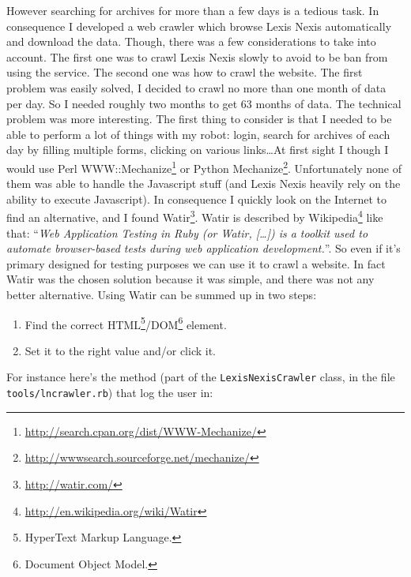 \documentclass[12pt]{report}
\begin{document}
			However searching for archives for more than a few days is a tedious task. In consequence I developed a web crawler which browse Lexis Nexis automatically and download the data. Though, there was a few considerations to take into account. The first one was to crawl Lexis Nexis slowly to avoid to be ban from using the service. The second one was how to crawl the website. The first problem was easily solved, I decided to crawl no more than one month of data per day. So I needed roughly two months to get 63 months of data. The technical problem was more interesting. The first thing to consider is that I needed to be able to perform a lot of things with my robot: login, search for archives of each day by filling multiple forms, clicking on various links\ldots At first sight I though I would use Perl WWW::Mechanize\footnote{\url{http://search.cpan.org/dist/WWW-Mechanize/}} or Python Mechanize\footnote{\url{http://wwwsearch.sourceforge.net/mechanize/}}. Unfortunately none of them was able to handle the Javascript stuff (and Lexis Nexis heavily rely on the ability to execute Javascript). In consequence I quickly look on the Internet to find an alternative, and I found Watir\footnote{\url{http://watir.com/}}. Watir is described by Wikipedia\footnote{\url{http://en.wikipedia.org/wiki/Watir}} like that: ``\emph{Web Application Testing in Ruby (or Watir, [\ldots]) is a toolkit used to automate browser-based tests during web application development.}''. So even if it's primary designed for testing purposes we can use it to crawl a website. In fact Watir was the chosen solution because it was simple, and there was not any better alternative. Using Watir can be summed up in two steps:
			\begin{enumerate}
				\item Find the correct HTML\footnote{HyperText Markup Language.}/DOM\footnote{Document Object Model.} element.
				\item Set it to the right value and/or click it.
			\end{enumerate}
			
			For instance here's the method (part of the \lstinline!LexisNexisCrawler! class, in the file \lstinline!tools/lncrawler.rb!) that log the user in:
			
\end{document}
